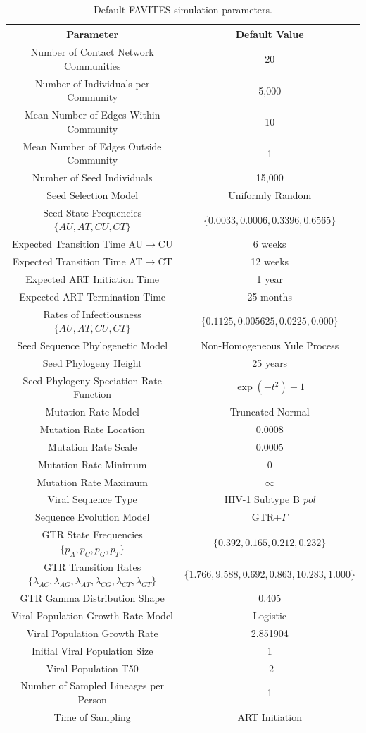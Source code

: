 \documentclass[a4paper,11pt]{article}
\begin{document}
\begin{table}[!h]
\begin{center}
\begin{tabular}{c c}
\toprule
\textbf{Parameter} & \textbf{Default Value}\\
\toprule
Number of Contact Network Communities & 20\\
Number of Individuals per Community & 5,000\\
Mean Number of Edges Within Community & 10\\
Mean Number of Edges Outside Community & 1\\
\hdashline
Number of Seed Individuals & 15,000\\
Seed Selection Model & Uniformly Random\\
Seed State Frequencies $\{AU,AT,CU,CT\}$ & $\{0.0033,0.0006,0.3396,0.6565\}$\\
Expected Transition Time AU$\rightarrow$CU & 6 weeks\\
Expected Transition Time AT$\rightarrow$CT & 12 weeks\\
Expected ART Initiation Time & 1 year\\
Expected ART Termination Time & 25 months\\
Rates of Infectiousness $\{AU,AT,CU,CT\}$ & $\{0.1125,0.005625,0.0225,0.000\}$\\
\hdashline
Seed Sequence Phylogenetic Model & Non-Homogeneous Yule Process\\
Seed Phylogeny Height & 25 years\\
Seed Phylogeny Speciation Rate Function & $\exp(-t^2)+1$\\
Mutation Rate Model & Truncated Normal\\
Mutation Rate Location & 0.0008\\
Mutation Rate Scale & 0.0005\\
Mutation Rate Minimum & 0\\
Mutation Rate Maximum & $\infty$\\
\hdashline
Viral Sequence Type & HIV-1 Subtype B \textit{pol}\\
Sequence Evolution Model & GTR+$\Gamma$\\
GTR State Frequencies $\{p_A,p_C,p_G,p_T\}$ & $\{0.392,0.165,0.212,0.232\}$\\
GTR Transition Rates $\{\lambda_{AC},\lambda_{AG},\lambda_{AT},\lambda_{CG},\lambda_{CT},\lambda_{GT}\}$ & $\{1.766,9.588,0.692,0.863,10.283,1.000\}$\\
GTR Gamma Distribution Shape & 0.405\\
\hdashline
Viral Population Growth Rate Model & Logistic\\
Viral Population Growth Rate & 2.851904\\
Initial Viral Population Size & 1\\
Viral Population T50 & -2\\
Number of Sampled Lineages per Person & 1\\
Time of Sampling & ART Initiation\\
\bottomrule
\end{tabular}
\end{center}
\caption{Default FAVITES simulation parameters.}
\label{tab:config-file}
\end{table}
\end{document}
